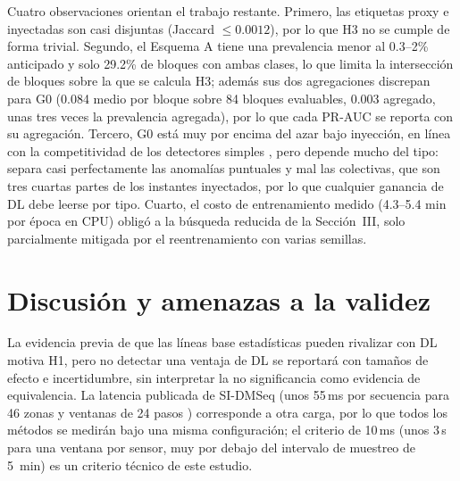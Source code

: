 \documentclass[conference]{IEEEtran}
\begin{document}
Cuatro observaciones orientan el trabajo restante. Primero, las etiquetas
proxy e inyectadas son casi disjuntas (Jaccard $\leq0.0012$), por lo que H3 no
se cumple de forma trivial. Segundo, el Esquema A tiene una prevalencia menor
al 0.3--2\% anticipado y solo 29.2\% de bloques con ambas clases, lo que limita
la intersecci\'on de bloques sobre la que se calcula H3; adem\'as sus dos
agregaciones discrepan para G0 (0.084 medio por bloque sobre 84 bloques
evaluables, 0.003 agregado, unas tres veces la prevalencia agregada), por lo
que cada PR-AUC se reporta con su agregaci\'on. Tercero, G0 est\'a muy por
encima del azar bajo inyecci\'on, en l\'inea con la competitividad de los
detectores simples \cite{taheri2026applicability,schmidl2022anomaly}, pero
depende mucho del tipo: separa casi perfectamente las anomal\'ias puntuales y
mal las colectivas, que son tres cuartas partes de los instantes inyectados,
por lo que cualquier ganancia de DL debe leerse por tipo. Cuarto, el costo de
entrenamiento medido (4.3--5.4 min por \'epoca en CPU) oblig\'o a la b\'usqueda
reducida de la Secci\'on~III, solo parcialmente mitigada por el reentrenamiento
con varias semillas.

\section{Discusi\'on y amenazas a la validez}

La evidencia previa de que las l\'ineas base estad\'isticas pueden rivalizar con
DL \cite{audibert2022deep,taheri2026applicability} motiva H1, pero no detectar
una ventaja de DL se reportar\'a con tama\~nos de efecto e incertidumbre, sin
interpretar la no significancia como evidencia de equivalencia. La latencia
publicada de SI-DMSeq (unos 55\,ms por secuencia para 46 zonas y ventanas de
24 pasos \cite{nouri2025sidmseq}) corresponde a otra carga, por lo que todos
los m\'etodos se medir\'an bajo una misma configuraci\'on; el criterio de 10\,ms
(unos 3\,s para una ventana por sensor, muy por debajo del intervalo de
muestreo de 5~min) es un criterio t\'ecnico de este estudio.
\end{document}
